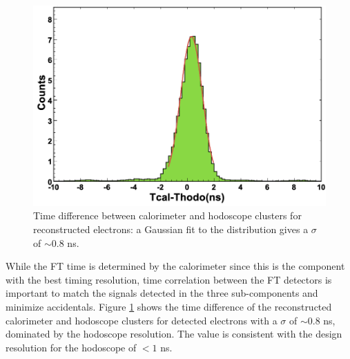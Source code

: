 \begin{figure}[h]
\includegraphics[height=0.6\columnwidth]{fig/ftcalhodo_time.png}
\caption{Time difference between calorimeter and hodoscope clusters for reconstructed electrons: a Gaussian fit to the distribution gives a $\sigma$ of $\sim 0.8$ ns.}
\label{fig:ftcalhodo_time}
\end{figure}
While the FT time is determined by the calorimeter since this is the component with the best timing resolution, time correlation between the FT detectors is important to match the signals detected in the three sub-components and minimize accidentals. Figure \ref{fig:ftcalhodo_time} shows the time difference of the reconstructed calorimeter and hodoscope clusters for detected electrons with a $\sigma$ of $\sim 0.8$ ns, dominated by the hodoscope resolution. The value is consistent with the design resolution for the hodoscope of $< 1$ ns.

